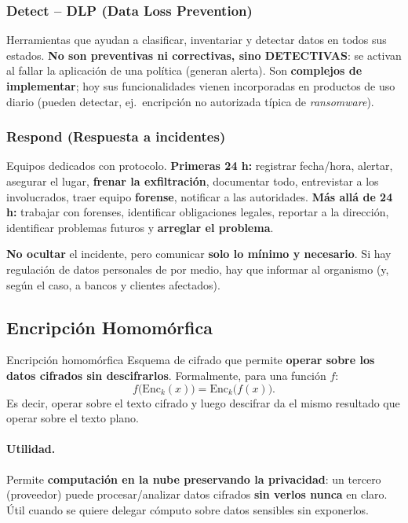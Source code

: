 \documentclass[../main.tex]{subfiles}
\begin{document}
\subsubsection{Detect -- DLP (Data Loss Prevention)}
Herramientas que ayudan a clasificar, inventariar y detectar datos en todos sus estados.
\textbf{No son preventivas ni correctivas, sino DETECTIVAS}: se activan al fallar la
aplicación de una política (generan alerta). Son \textbf{complejos de implementar}; hoy
sus funcionalidades vienen incorporadas en productos de uso diario (pueden detectar,
ej.\ encripción no autorizada típica de \emph{ransomware}).

\subsubsection{Respond (Respuesta a incidentes)}
Equipos dedicados con protocolo. \textbf{Primeras 24 h:} registrar fecha/hora, alertar,
asegurar el lugar, \textbf{frenar la exfiltración}, documentar todo, entrevistar a los
involucrados, traer equipo \textbf{forense}, notificar a las autoridades. \textbf{Más
allá de 24 h:} trabajar con forenses, identificar obligaciones legales, reportar a la
dirección, identificar problemas futuros y \textbf{arreglar el problema}.
\begin{destacado}
\textbf{No ocultar} el incidente, pero comunicar \textbf{solo lo mínimo y necesario}.
Si hay regulación de datos personales de por medio, hay que informar al organismo (y,
según el caso, a bancos y clientes afectados).
\end{destacado}

\subsection{Encripción Homomórfica}

\begin{definicion}{Encripción homomórfica}
Esquema de cifrado que permite \textbf{operar sobre los datos cifrados sin
descifrarlos}. Formalmente, para una función $f$:
\[
f\big(\mathrm{Enc}_k(x)\big) = \mathrm{Enc}_k\big(f(x)\big).
\]
Es decir, operar sobre el texto cifrado y luego descifrar da el mismo resultado que
operar sobre el texto plano.
\end{definicion}

\paragraph{Utilidad.} Permite \textbf{computación en la nube preservando la privacidad}:
un tercero (proveedor) puede procesar/analizar datos cifrados \textbf{sin verlos nunca}
en claro. Útil cuando se quiere delegar cómputo sobre datos sensibles sin exponerlos.
\end{document}
